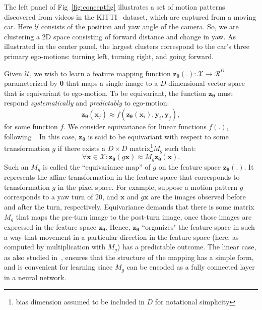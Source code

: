\documentclass[10pt,twocolumn,letterpaper]{article}
\newcommand{\changes}{}
\begin{document}
The left panel of Fig~\ref{fig:conceptfig} illustrates a set of motion patterns discovered from videos in the KITTI~\cite{kitti} dataset, which are captured from a moving car.  Here $\mathcal{Y}$ consists of the position and yaw angle of the camera.  So, we are clustering a 2D space consisting of forward distance and change in yaw.  As illustrated in the center panel, the largest clusters correspond to the car's three primary ego-motions: turning left, turning right, and going forward.


Given $\mathcal{U}$, we wish to learn a feature mapping function $\mathbf{z}_{\bm{\theta}}(.): \mathcal{X} \rightarrow \mathcal{R}^D$ parameterized by $\bm{\theta}$ that maps a single image to a $D$-dimensional vector space that is equivariant to ego-motion.  To be equivariant, the function $\mathbf{z}_{\bm{\theta}}$ must respond \emph{systematically} and \emph{predictably} to ego-motion:
\vspace{-0.05in}\begin{equation}
  \mathbf{z}_{\bm{\theta}}(\bm{x}_j) \approx f(\mathbf{z}_{\bm{\theta}}(\bm{x}_i),\bm{y}_i,\bm{y}_j),
\end{equation}%
for some function $f$.  We consider equivariance for linear \changes{functions $f(.)$}, following~\cite{Vedaldi2014}.  In this case,
$\mathbf{z}_{\bm{\theta}}$ is said to be equivariant with respect to some transformation $g$  if there exists a $D\times D$ matrix\footnote{bias dimension assumed to be included in $D$ for notational simplicity}$M_g$ such that:
\vspace{-0.05in}\begin{equation}
  \forall \bm{x} \in \mathcal{X}:\mathbf{z}_{\bm{\theta}}(g \bm{x}) \approx M_g \mathbf{z}_{\bm{\theta}}(\bm{x}).
  \label{eq:equivar}
\end{equation}%
Such an $M_g$ is called the ``equivariance map'' of $g$ on the feature space $\mathbf{z}_{\bm{\theta}}(.)$.  It represents the affine transformation in the feature space that corresponds to transformation $g$ in the pixel space.  For example, suppose a motion pattern $g$ corresponds to a yaw turn of 20\textdegree, and $\bm{x}$ and  $g\bm{x}$ are the images observed before and after the turn, respectively.  Equivariance demands that there is some matrix $M_g$ that maps the pre-turn image to the post-turn image, once those images are expressed in the feature space $\mathbf{z}_{\bm{\theta}}$.  Hence, $\mathbf{z}_{\bm{\theta}}$ ``organizes" the feature space in such a way that movement in a particular direction in the feature space (here, as computed by multiplication with $M_g$) has a predictable outcome.  The linear case, as also studied in~\cite{Vedaldi2014}, ensures that the structure of the mapping has a simple form, and is convenient for learning since $M_g$ can be encoded as a fully connected layer in a neural network.
\end{document}
